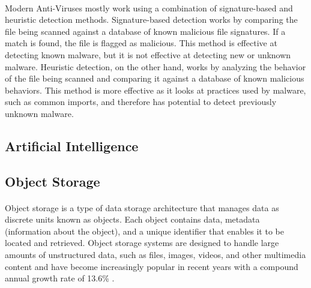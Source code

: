 \documentclass[12pt, conference, final, a4paper, onecolumn, compsoc]{IEEEtran}
\begin{document}
    \paragraph{}
    Modern Anti-Viruses mostly work using a combination of signature-based and
    heuristic detection methods. Signature-based detection works by comparing
    the file being scanned against a database of known malicious file
    signatures. If a match is found, the file is flagged as malicious. This
    method is effective at detecting known malware, but it is not effective at
    detecting new or unknown malware. Heuristic detection, on the other hand,
    works by analyzing the behavior of the file being scanned and comparing it
    against a database of known malicious behaviors. This method is more
    effective as it looks at practices used by malware, such as common imports,
    and therefore has potential to detect previously unknown malware.


    \subsection*{Artificial Intelligence}

    \paragraph{}

    \subsection*{Object Storage}
    \paragraph{}
    Object storage is a type of data storage architecture that manages data as
    discrete units known as objects. Each object contains data, metadata
    (information about the object), and a unique identifier that enables it to
    be located and retrieved. Object storage systems are designed to handle
    large amounts of unstructured data, such as files, images, videos, and other
    multimedia content and have become increasingly popular in recent years with
    a compound annual growth rate of 13.6\% \citep{object-storage-market}.
\end{document}
